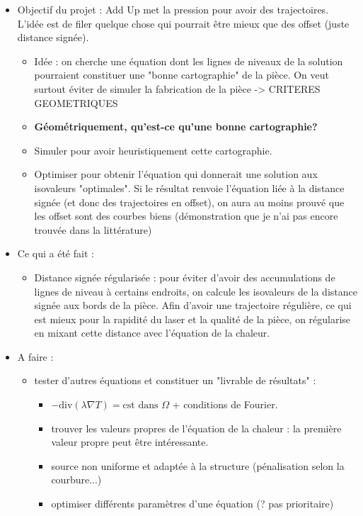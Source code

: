 \documentclass[11pt,a4paper]{article}
\begin{document}
\begin{itemize}
	\item Objectif du projet : Add Up met la pression pour avoir des trajectoires. L'idée est de filer quelque chose qui pourrait être mieux que des offset (juste distance signée). 
	\begin{itemize}
		\item Idée : on cherche une équation dont les lignes de niveaux de la solution pourraient constituer une "bonne cartographie" de la pièce. On veut surtout éviter de simuler la fabrication de la pièce -> CRITERES GEOMETRIQUES
		\item \textbf{Géométriquement, qu'est-ce qu'une bonne cartographie?}
		\item Simuler pour avoir heuristiquement cette cartographie.
		\item Optimiser pour obtenir l'équation qui donnerait une solution aux isovaleurs "optimales". Si le résultat renvoie l'équation liée à la distance signée (et donc des trajectoires en offset), on aura au moins prouvé que les offset sont des courbes biens (démonstration que je n'ai pas encore trouvée dans la littérature)
		
	\end{itemize}
	\item Ce qui a été fait :
	\begin{itemize}
		\item Distance signée régularisée : pour éviter d'avoir des accumulations de lignes de niveau à certains endroits, on calcule les isovaleurs de la distance signée aux bords de la pièce. Afin d'avoir une trajectoire régulière, ce qui est mieux pour la rapidité du laser et la qualité de la pièce, on régularise en mixant cette distance avec l'équation de la chaleur.
	\end{itemize}
	
	\item A faire : 
	\begin{itemize}
		\item tester d'autres équations et constituer un "livrable de résultats" :
		\begin{itemize}
			\item $-\textrm{div}(\lambda\nabla T)=\textrm{cst}\,\,\textrm{dans}\,\,\Omega$ + conditions de Fourier.
			\item trouver les valeurs propres de l'équation de la chaleur : la première valeur propre peut être intéressante.
			\item source non uniforme et adaptée à la structure (pénalisation selon la courbure...)
			\item optimiser différents paramètres d'une équation (? pas prioritaire)
		\end{itemize}
		

\end{itemize}
\end{itemize}
\end{document}
